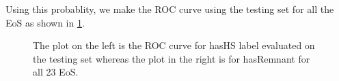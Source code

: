 Using this probablity, we make the ROC curve using the testing set for all the EoS as shown in \ref{fig:ROC}. 

\begin{figure}[htp]
  \centering
  \quad
  \caption{The plot on the left is the ROC curve for hasHS label evaluated on the testing set whereas the plot in the right is for hasRemnant for all 23 EoS. }
  \label{fig:ROC}
\end{figure}
